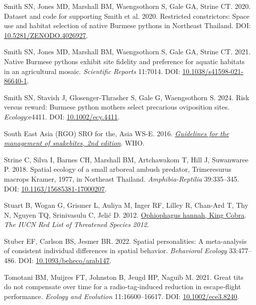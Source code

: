 \documentclass[10pt,a4paper]{article}
\newlength{\cslhangindent}
\newenvironment{CSLReferences}[2] %
 {\begin{list}{}{%
  \setlength{\itemindent}{0pt}
  \setlength{\leftmargin}{0pt}
  \setlength{\parsep}{0pt}
  \ifodd #1
   \setlength{\leftmargin}{\cslhangindent}
   \setlength{\itemindent}{-1\cslhangindent}
  \fi
  \setlength{\itemsep}{#2\baselineskip}}}
 {\end{list}}
\begin{document}
\begin{CSLReferences}{1}{0}
Smith SN, Jones MD, Marshall BM, Waengsothorn S, Gale GA, Strine CT. 2020. Dataset and code for supporting {Smith} et al. 2020. {Restricted} constrictors: {Space} use and habitat selection of native {Burmese} pythons in {Northeast} {Thailand}. DOI: \href{https://doi.org/10.5281/ZENODO.4026927}{10.5281/ZENODO.4026927}.

Smith SN, Jones MD, Marshall BM, Waengsothorn S, Gale GA, Strine CT. 2021. Native {Burmese} pythons exhibit site fidelity and preference for aquatic habitats in an agricultural mosaic. \emph{Scientific Reports} 11:7014. DOI: \href{https://doi.org/10.1038/s41598-021-86640-1}{10.1038/s41598-021-86640-1}.

Smith SN, Stavish J, Glosenger‐Thrasher S, Gale G, Waengsothorn S. 2024. Risk versus reward: {Burmese} python mothers select precarious oviposition sites. \emph{Ecology}:e4411. DOI: \href{https://doi.org/10.1002/ecy.4411}{10.1002/ecy.4411}.

South East Asia (RGO) SRO for the, Asia WS-E. 2016. \emph{\href{https://www.who.int/publications/i/item/9789290225300}{Guidelines for the management of snakebites, 2nd edition}}. WHO.

Strine C, Silva I, Barnes CH, Marshall BM, Artchawakom T, Hill J, Suwanwaree P. 2018. Spatial ecology of a small arboreal ambush predator, {Trimeresurus} macrops {Kramer}, 1977, in {Northeast} {Thailand}. \emph{Amphibia-Reptilia} 39:335--345. DOI: \href{https://doi.org/10.1163/15685381-17000207}{10.1163/15685381-17000207}.

Stuart B, Wogan G, Grismer L, Auliya M, Inger RF, Lilley R, Chan-Ard T, Thy N, Nguyen TQ, Srinivasulu C, Jelić D. 2012. \href{http://dx.doi.org/10.2305/IUCN.UK.2012-\%201.RLTS.T177540A1491874.en\%0ACopyright:}{Ophiophagus hannah, {King} {Cobra}}. \emph{The IUCN Red List of Threatened Species 2012}.

Stuber EF, Carlson BS, Jesmer BR. 2022. Spatial personalities: A meta-analysis of consistent individual differences in spatial behavior. \emph{Behavioral Ecology} 33:477--486. DOI: \href{https://doi.org/10.1093/beheco/arab147}{10.1093/beheco/arab147}.

Tomotani BM, Muijres FT, Johnston B, Jeugd HP, Naguib M. 2021. Great tits do not compensate over time for a radio‐tag‐induced reduction in escape‐flight performance. \emph{Ecology and Evolution} 11:16600--16617. DOI: \href{https://doi.org/10.1002/ece3.8240}{10.1002/ece3.8240}.


\end{CSLReferences}
\end{document}

